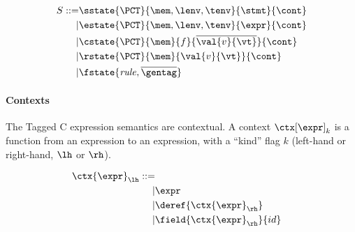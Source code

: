 \documentclass{article}
\begin{document}
\[\begin{aligned}
S ::= & \sstate{\PCT}{\mem,\lenv,\tenv}{\stmt}{\cont} \\
| & \estate{\PCT}{\mem,\lenv,\tenv}{\expr}{\cont} \\
| & \cstate{\PCT}{\mem}{f}{\overline{\val{v}{\vt}}}{\cont} \\
| & \rstate{\PCT}{\mem}{\val{v}{\vt}}{\cont} \\
| & \fstate{\mathit{rule},\overline{\gentag}} \\
\end{aligned}\]

\paragraph*{Contexts}

The Tagged C expression semantics are contextual. A context \(\ctx[\expr]_k\) is a function from an
expression to an expression, with a ``kind'' flag \(k\) (left-hand or right-hand, \(\lh\) or \(\rh\)).

\[\begin{aligned}
\ctx{\expr}_\lh ::= \\
| & \expr & \\ %
| & \deref{\ctx{\expr}_\rh} \\ %
| & \field{\ctx{\expr}_\rh}{id} \\ %
\end{aligned}\]
\end{document}
